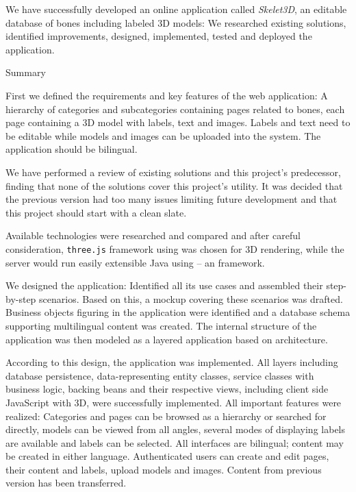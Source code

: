 We have successfully developed an online application called {\it Skelet3D}, an editable database of bones including labeled 3D models: We researched existing solutions, identified improvements, designed, implemented, tested and deployed the application.

\sec Summary

First we defined the requirements and key features of the web application: A hierarchy of categories and subcategories containing pages related to bones, each page containing a 3D model with labels, text and images. Labels and text need to be editable while models and images can be uploaded into the system. The application should be bilingual.

We have performed a review of existing solutions and this project’s predecessor, finding that none of the solutions cover this project’s utility. It was decided that the previous version had too many issues limiting future development and that this project should start with a clean slate.

Available technologies were researched and compared and after careful consideration, {\tt three.js} framework using  was chosen for 3D rendering, while the server would run easily extensible Java  using  -- an  framework.

We designed the application: Identified all its use cases and assembled their step-by-step scenarios. Based on this, a mockup  covering these scenarios was drafted. Business objects figuring in the application were identified and a database schema supporting multilingual content was created. The internal structure of the application was then modeled as a layered application based on  architecture.

According to this design, the application was implemented. All layers including database persistence, data-representing entity classes, service classes with business logic, backing beans and their respective  views, including client side JavaScript with 3D, were successfully implemented. All important features were realized: Categories and pages can be browsed as a hierarchy or searched for directly, models can be viewed from all angles, several modes of displaying labels are available and labels can be selected. All interfaces are bilingual; content may be created in either language. Authenticated users can create and edit pages, their content and labels, upload models and images. Content from previous version has been transferred.

